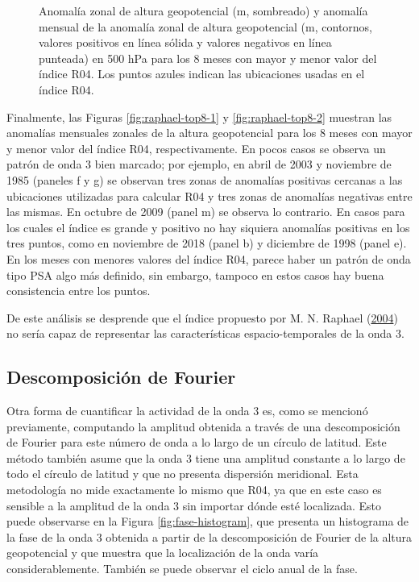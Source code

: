 \documentclass[12pt,oneside,a4paper]{reedthesis}
\begin{document}
\begin{figure}
{}

\caption{Anomalía zonal de altura geopotencial (m, sombreado) y anomalía mensual de la anomalía zonal de altura geopotencial (m, contornos, valores positivos en línea sólida y valores negativos en línea punteada) en 500 hPa para los 8 meses con mayor y menor valor del índice R04. Los puntos azules indican las ubicaciones usadas en el índice R04.}\label{fig:raphael-top8}
\end{figure}



Finalmente, las Figuras \ref{fig:raphael-top8-1} y \ref{fig:raphael-top8-2} muestran las anomalías mensuales zonales de la altura geopotencial para los 8 meses con mayor y menor valor del índice R04, respectivamente.
En pocos casos se observa un patrón de onda 3 bien marcado; por ejemplo, en abril de 2003 y noviembre de 1985 (paneles f y g) se observan tres zonas de anomalías positivas cercanas a las ubicaciones utilizadas para calcular R04 y tres zonas de anomalías negativas entre las mismas.
En octubre de 2009 (panel m) se observa lo contrario.
En casos para los cuales el índice es grande y positivo no hay siquiera anomalías positivas en los tres puntos, como en noviembre de 2018 (panel b) y diciembre de 1998 (panel e).
En los meses con menores valores del índice R04, parece haber un patrón de onda tipo PSA algo más definido, sin embargo, tampoco en estos casos hay buena consistencia entre los puntos.

De este análisis se desprende que el índice propuesto por M. N. Raphael (\protect\hyperlink{ref-raphael2004}{2004}) no sería capaz de representar las características espacio-temporales de la onda 3.

\hypertarget{descomposiciuxf3n-de-fourier}{%
\subsection{Descomposición de Fourier}\label{descomposiciuxf3n-de-fourier}}

Otra forma de cuantificar la actividad de la onda 3 es, como se mencionó previamente, computando la amplitud obtenida a través de una descomposición de Fourier para este número de onda a lo largo de un círculo de latitud.
Este método también asume que la onda 3 tiene una amplitud constante a lo largo de todo el círculo de latitud y que no presenta dispersión meridional.
Esta metodología no mide exactamente lo mismo que R04, ya que en este caso es sensible a la amplitud de la onda 3 sin importar dónde esté localizada.
Esto puede observarse en la Figura \ref{fig:fase-histogram}, que presenta un histograma de la fase de la onda 3 obtenida a partir de la descomposición de Fourier de la altura geopotencial y que muestra que la localización de la onda varía considerablemente.
También se puede observar el ciclo anual de la fase.
\end{document}
